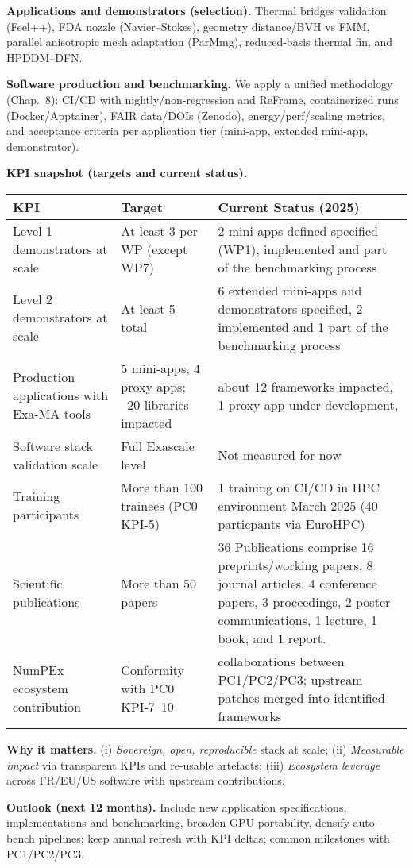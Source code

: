 \medskip
\noindent
\textbf{Applications and demonstrators (selection).}
Thermal bridges validation (Feel++), FDA nozzle (Navier–Stokes), geometry distance/BVH vs FMM,
parallel anisotropic mesh adaptation (ParMmg), reduced-basis thermal fin, and HPDDM–DFN. %

\medskip
\noindent
\textbf{Software production and benchmarking.}
We apply a unified methodology (Chap.~8): CI/CD with nightly/non-regression and ReFrame,
containerized runs (Docker/Apptainer), FAIR data/DOIs (Zenodo), energy/perf/scaling metrics,
and acceptance criteria per application tier (mini-app, extended mini-app, demonstrator). %

\medskip
\noindent
\textbf{KPI snapshot (targets and current status).}
\begin{center}
\begin{tabular}{p{4cm} p{4cm} p{6cm}}
\toprule
\textbf{KPI} & \textbf{Target} & \textbf{Current Status (2025)} \\
\midrule
Level 1 demonstrators at scale & At least 3 per WP (except WP7) & 2 mini-apps defined specified (WP1), implemented and  part of the benchmarking process \\
Level 2 demonstrators at scale & At least 5 total &  6 extended mini-apps and demonstrators specified, 2 implemented and 1 part of the benchmarking process \\
Production applications with Exa-MA tools & 5 mini-apps, 4 proxy apps; ~20 libraries impacted &  about 12 frameworks impacted, 1 proxy app under development, \\
Software stack validation scale & Full Exascale level & Not measured for now \\
Training participants & More than 100 trainees (PC0 KPI-5) &  1 training on CI/CD in HPC environment March 2025 (40 particpants via EuroHPC)\\
Scientific publications & More than 50 papers & 36 Publications comprise 16 preprints/working papers, 8 journal articles, 4 conference papers, 3 proceedings, 2 poster communications, 1 lecture, 1 book, and 1 report. \\
NumPEx ecosystem contribution & Conformity with PC0 KPI-7--10 & collaborations between PC1/PC2/PC3; upstream patches merged into identified frameworks \\
\bottomrule
\end{tabular}
\end{center}

\medskip
\noindent
\textbf{Why it matters.} (i) \emph{Sovereign, open, reproducible} stack at scale; (ii) \emph{Measurable
impact} via transparent KPIs and re-usable artefacts; (iii) \emph{Ecosystem leverage} across FR/EU/US
software with upstream contributions.

\medskip
\noindent
\textbf{Outlook (next 12 months).}
Include new application specifications, implementations and benchmarking, broaden GPU portability, densify auto-bench
pipelines; keep annual refresh with KPI deltas; common milestones with PC1/PC2/PC3.


